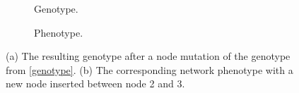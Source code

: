\begin{figure}[htb]
    \begin{mdframed}
        \begin{subfigure}[b]{0.45\textwidth}
            \centering
            \resizebox{1\textwidth}{!}{}
            \caption{Genotype.}
            \label{node_genotype}
        \end{subfigure}
        \begin{subfigure}[b]{0.45\textwidth}
            \centering
            \resizebox{0.65\textwidth}{!}{}
            \caption{Phenotype.}
            \label{node_phenotype}
        \end{subfigure}
    \end{mdframed}
    \caption{ (a) The resulting genotype after a node mutation of the genotype from \ref{genotype}. (b) The
    corresponding network phenotype with a new node inserted between node 2 and 3.}
    \label{node_mutation}
\end{figure}
